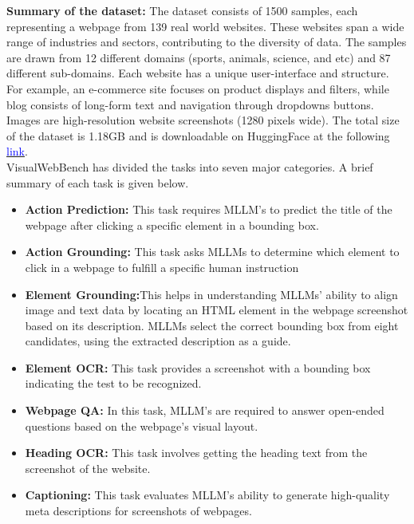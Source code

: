\documentclass[11pt,a4paper]{article}
\begin{document}
\textbf{Summary of the dataset: }The dataset consists of 1500 samples, each representing a webpage from 139 real world websites. These websites span a wide range of industries and sectors, contributing to the diversity of data. The samples are drawn from 12 different domains (sports, animals, science, and etc) and 87 different sub-domains. Each website has a unique user-interface and structure. For example, an e-commerce site focuses on product displays and filters, while blog consists of long-form text and navigation through dropdowns buttons. Images are high-resolution website screenshots (1280 pixels wide). The total size of the dataset is 1.18GB and is downloadable on HuggingFace at the following \href{https://huggingface.co/datasets/visualwebbench/VisualWebBench}{\textcolor{blue}{link}}.\\
VisualWebBench has divided the tasks into seven major categories. A brief summary of each task is given below.
\begin{itemize}
    \item {\textbf{Action Prediction:} This task requires  MLLM's to predict the title of the webpage after clicking a specific element in a bounding box.}
    \item {\textbf{Action Grounding:} This task asks MLLMs to determine which element to click in a webpage to fulfill a specific human instruction}
    \item {\textbf{Element Grounding:}This helps in understanding MLLMs' ability to align image and text data by locating an HTML element in the webpage screenshot based on its description. MLLMs select the correct bounding box from eight candidates, using the extracted description as a guide.}
    \item {\textbf{Element OCR:} This task provides a screenshot with a bounding box indicating the test to be recognized.}
    \item {\textbf{Webpage QA:} In this task, MLLM's are required to answer open-ended questions based on the webpage's visual layout.}
    \item {\textbf{Heading OCR: }This task involves getting the heading text from the screenshot of the website.}
    \item {\textbf{Captioning:} This task evaluates MLLM's ability to generate high-quality meta descriptions for screenshots of webpages.}
\end{itemize}

\end{document}
